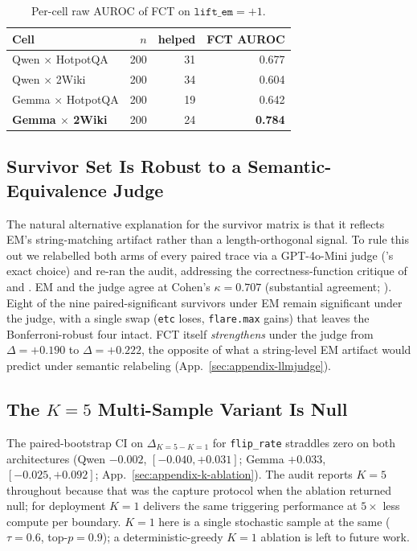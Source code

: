 \documentclass[11pt]{article}
\begin{document}
\begin{table}[h]
\centering\small
\begin{tabular}{@{}lrrr@{}}
\toprule
\textbf{Cell} & $n$ & \textbf{helped} & \textbf{FCT AUROC} \\
\midrule
Qwen $\times$ HotpotQA  & 200 & 31 & 0.677 \\
Qwen $\times$ 2Wiki     & 200 & 34 & 0.604 \\
Gemma $\times$ HotpotQA & 200 & 19 & 0.642 \\
\textbf{Gemma $\times$ 2Wiki} & 200 & 24 & \textbf{0.784} \\
\bottomrule
\end{tabular}
\caption{Per-cell raw AUROC of FCT on $\texttt{lift\_em}{=}+1$.}
\label{tab:fct-percell}
\end{table}

\subsection{Survivor Set Is Robust to a Semantic-Equivalence Judge}
\label{sec:results-llmjudge}

The natural alternative explanation for the survivor matrix is that it reflects EM's string-matching artifact rather than a length-orthogonal signal. To rule this out we relabelled both arms of every paired trace via a GPT-4o-Mini judge (\citeauthor{janiak_illusion_2025}'s exact choice) and re-ran the audit, addressing the correctness-function critique of \citet{janiak_illusion_2025} and \citet{ielanskyi_addressing_2025}. EM and the judge agree at Cohen's $\kappa = 0.707$ (substantial agreement; \citealp{landis_measurement_1977}). Eight of the nine paired-significant survivors under EM remain significant under the judge, with a single swap (\texttt{etc} loses, \texttt{flare.max} gains) that leaves the Bonferroni-robust four intact. FCT itself \emph{strengthens} under the judge from $\Delta = +0.190$ to $\Delta = +0.222$, the opposite of what a string-level EM artifact would predict under semantic relabeling (App.~\ref{sec:appendix-llmjudge}).

\subsection{The $K{=}5$ Multi-Sample Variant Is Null}
\label{sec:results-ablation}

The paired-bootstrap CI on $\Delta_{K{=}5 - K{=}1}$ for \texttt{flip\_rate} straddles zero on both architectures (Qwen $-0.002$, $[-0.040, +0.031]$; Gemma $+0.033$, $[-0.025, +0.092]$; App.~\ref{sec:appendix-k-ablation}). The audit reports $K{=}5$ throughout because that was the capture protocol when the ablation returned null; for deployment $K{=}1$ delivers the same triggering performance at $5\times$ less compute per boundary. $K{=}1$ here is a single stochastic sample at the same ($\tau{=}0.6$, top-$p{=}0.9$); a deterministic-greedy $K{=}1$ ablation is left to future work.
\end{document}
